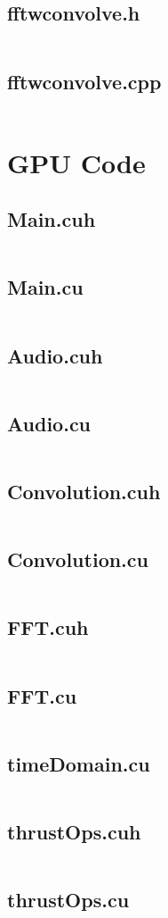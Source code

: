 \subsection{fftwconvolve.h}
\inputminted[breaklines, breakanywhere]{cpp}{CPUsrc/fftwconvolve.h}
\subsection{fftwconvolve.cpp}
\inputminted[breaklines, breakanywhere]{cpp}{CPUsrc/fftwconvolve.cpp}
\section{GPU Code}
\subsection{Main.cuh}
\inputminted[breaklines, breakanywhere]{cuda}{GPUsrc/Main.cuh}
\subsection{Main.cu}
\inputminted[breaklines, breakanywhere]{cuda}{GPUsrc/Main.cu}
\subsection{Audio.cuh}
\inputminted[breaklines, breakanywhere]{cuda}{GPUsrc/Audio.cuh}
\subsection{Audio.cu}
\inputminted[breaklines, breakanywhere]{cuda}{GPUsrc/Audio.cu}
\subsection{Convolution.cuh}
\inputminted[breaklines, breakanywhere]{cuda}{GPUsrc/Convolution.cuh}
\subsection{Convolution.cu}
\inputminted[breaklines, breakanywhere]{cuda}{GPUsrc/Convolution.cu}
\subsection{FFT.cuh}
\inputminted[breaklines, breakanywhere]{cuda}{GPUsrc/FFT.cuh}
\subsection{FFT.cu}
\inputminted[breaklines, breakanywhere]{cuda}{GPUsrc/FFT.cu}
\subsection{timeDomain.cu}
\inputminted[breaklines, breakanywhere]{cuda}{GPUsrc/timeDomain.cu}
\subsection{thrustOps.cuh}
\inputminted[breaklines, breakanywhere]{cuda}{GPUsrc/thrustOps.cuh}
\subsection{thrustOps.cu}
\inputminted[breaklines, breakanywhere]{cuda}{GPUsrc/thrustOps.cu}

